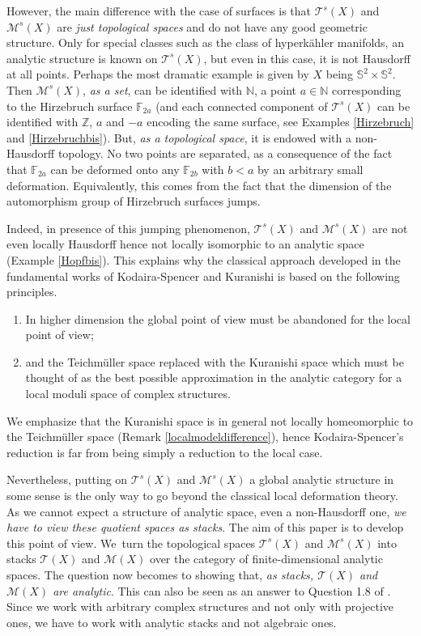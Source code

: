 \documentclass[JEP,XML,SOM,Unicode]{cedram}
\let\mathcal\mathscr
\theoremstyle{plain}
\theoremstyle{definition}
\theoremstyle{remark}
\numberwithin{equation}{section}
\newcommand{\T}{\mathcal T(X)}
\begin{document}
However, the main difference with the case of surfaces is that $\mathcal T^s(X)$ and $\mathcal M^s(X)$ are \emph{just topological spaces} and do not have any good geometric structure. Only for special classes such as the class of hyperkähler manifolds, an analytic structure is known on $\mathcal T^s(X)$, but even in this case, it is not Hausdorff at all points. Perhaps the most dramatic example is given by $X$ being $\mathbb S^2\times\mathbb S^2$. Then $\mathcal M^s(X)$, \emph{as a set}, can be identified with $\mathbb N$, a point $a\in\mathbb N$ corresponding to the Hirzebruch surface $\mathbb F_{2a}$ (and each connected component of $\mathcal T^s(X)$ can be identified with $\mathbb Z$, $a$ and $-a$ encoding the same surface, see Examples \ref{Hirzebruch} and \ref{Hirzebruchbis}). But, \emph{as a topological space}, it is endowed with a non-Hausdorff topology. No two points are separated, as a consequence of the fact that $\mathbb F_{2a}$ can be deformed onto any $\mathbb F_{2b}$ with $b<a$ by an arbitrary small deformation. Equivalently, this comes from the fact that the dimension of the automorphism group of Hirzebruch surfaces jumps.

Indeed, in presence of this jumping phenomenon, $\mathcal T^s(X)$ and $\mathcal M^s(X)$ are not even locally Hausdorff hence not locally isomorphic to an analytic space (\cf Example \ref{Hopfbis}). This explains why the classical approach developed in the fundamental works of Kodaira-Spencer and Kuranishi is based on the following principles.
\begin{enumerate}
\item
In higher dimension the global point of view must be abandoned for the local point of view;
\item
and the Teichmüller space replaced with the Kuranishi space which must be thought of as the best possible approximation in the analytic category for a local moduli space of complex structures.
\end{enumerate}

We emphasize that the Kuranishi space is in general not locally homeomorphic to the Teichmüller space (\cf Remark \ref{localmodeldifference}), hence Kodaira-Spencer's reduction is far from being simply a reduction to the local case.

Nevertheless, putting on $\mathcal T^s(X)$ and $\mathcal M^s(X)$ a global analytic structure in some sense is the only way to go beyond the classical local deformation theory. As we cannot expect a structure of analytic space, even a non-Hausdorff one, \emph{we have to view these quotient spaces as stacks}. The aim of this paper is to develop this point of view. We~turn the topological spaces $\mathcal T^s(X)$ and $\mathcal M^s(X)$ into stacks $\T$ and $\mathcal M(X)$ over the category of finite-dimensional analytic spaces. The question now becomes to showing that, \emph{as stacks, $\T$ and $\mathcal M(X)$ are analytic}. This can also be seen as an answer to Question 1.8 of \cite{VerbitskySurvey}. Since we work with arbitrary complex structures and not only with projective ones, we have to work with analytic stacks and not algebraic ones.
\end{document}
